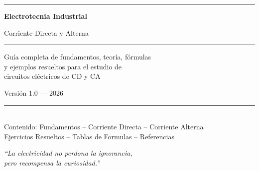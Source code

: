 \documentclass[11pt,a4paper,openright,twoside]{book}
\begin{document}
\begin{titlepage}
\centering
\vspace*{1cm}

{\color{chapterblue}\rule{\textwidth}{3pt}}

\vspace{2cm}

{\fontsize{36}{42}\selectfont\bfseries\sffamily\color{chapterblue}%
  Electrotecnia Industrial\\[0.3cm]%
}

{\fontsize{18}{24}\selectfont\sffamily\color{sectionblue}%
  Corriente Directa y Alterna\\[0.5cm]%
}

{\color{chapterblue}\rule{0.6\textwidth}{1.5pt}}

\vspace{1.5cm}

{\large\sffamily\color{sectionblue!80!black}%
  Guía completa de fundamentos, teoría, fórmulas\\
  y ejemplos resueltos para el estudio de\\
  circuitos eléctricos de CD y CA%
}

\vspace{2cm}

{\large\sffamily\color{sectionblue!60!black}%
  Versión 1.0 --- 2026%
}

\vfill

{\color{chapterblue}\rule{\textwidth}{3pt}}\\[0.3cm]
{\small\sffamily\color{chapterblue!60!black}%
  Contenido: Fundamentos -- Corriente Directa -- Corriente Alterna\\
  Ejercicios Resueltos -- Tablas de Formulas -- Referencias%
}

\end{titlepage}

\thispagestyle{empty}
\vspace*{\fill}
\begin{center}
\textit{\Large\sffamily\color{chapterblue!70!black}%
  ``La electricidad no perdona la ignorancia,\\
  pero recompensa la curiosidad.''}
\end{center}
\vspace*{\fill}
\newpage
\end{document}
